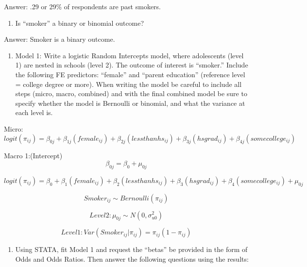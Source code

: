 \documentclass[]{article}
\providecommand{\tightlist}{%
  \setlength{\itemsep}{0pt}\setlength{\parskip}{0pt}}
\begin{document}
Answer: .29 or 29\% of respondents are past smokers.

\begin{enumerate}
\def\labelenumi{\alph{enumi}.}
\setcounter{enumi}{2}
\tightlist
\item
  Is ``smoker'' a binary or binomial outcome?
\end{enumerate}

Answer: Smoker is a binary outcome.

\begin{enumerate}
\def\labelenumi{\arabic{enumi})}
\setcounter{enumi}{3}
\tightlist
\item
  Model 1: Write a logistic Random Intercepts model, where adolescents
  (level 1) are nested in schools (level 2). The outcome of interest is
  ``smoker.'' Include the following FE predictors: ``female'' and
  ``parent education'' (reference level = college degree or more). When
  writing the model be careful to include all steps (micro, macro,
  combined) and with the final combined model be sure to specify whether
  the model is Bernoulli or binomial, and what the variance at each
  level is.
\end{enumerate}

Micro:
\[ logit(\pi_{ij}) = \beta_{0j} + \beta_{1j}(female_{ij}) + \beta_{2j}(lessthanhs_{ij}) + \beta_{3j}(hsgrad_{ij}) + \beta_{4j}(somecollege_{ij}) \]

Macro 1:(Intercept) \[ \beta_{0j} = \beta_0 + \mu_{0j} \]

\[ logit(\pi_{ij}) = \beta_0 + \beta_1(female_{ij}) + \beta_2(lessthanhs_{ij}) + \beta_3(hsgrad_{ij}) + \beta_4(somecollege_{ij}) + \mu_{0j}\]

\[ Smoker_{ij} \sim Bernoulli(\pi_{ij})\]

\[ Level 2: \mu_{0j} \sim N(0, \sigma^2_{u0}) \]

\[  Level 1: Var(Smoker_{ij} | \pi_{ij}) = \pi_{ij}(1 - \pi_{ij})  \]

\begin{enumerate}
\def\labelenumi{\arabic{enumi})}
\setcounter{enumi}{4}
\tightlist
\item
  Using STATA, fit Model 1 and request the ``betas'' be provided in the
  form of Odds and Odds Ratios. Then answer the following questions
  using the results:
\end{enumerate}
\end{document}
